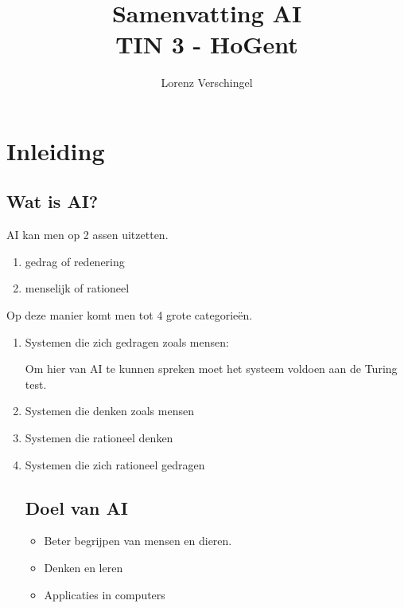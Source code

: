 \documentclass[a4paper,12pt]{article}
\title{Samenvatting AI \\ \large TIN 3 - HoGent}
\author{Lorenz Verschingel}
\begin{document}
\maketitle
\section{Inleiding}
\subsection{Wat is AI?}
AI kan men op 2 assen uitzetten.

\begin{enumerate}
\item gedrag of redenering
\item menselijk of rationeel
\end{enumerate}

Op deze manier komt men tot 4 grote categorieën.

\begin{enumerate}
\item Systemen die zich gedragen zoals mensen:

Om hier van AI te kunnen spreken moet het systeem voldoen aan de Turing test.

\item Systemen die denken zoals mensen
\item Systemen die rationeel denken
\item Systemen die zich rationeel gedragen

\subsection{Doel van AI}
\begin{itemize}
\item Beter begrijpen van mensen en dieren.
\item Denken en leren
\item Applicaties in computers
\end{itemize}
\end{enumerate}
\end{document}
